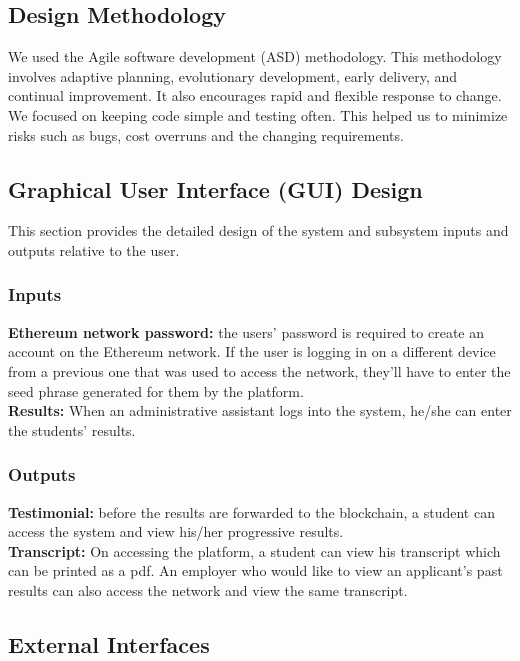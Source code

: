 \subsection{Design Methodology}
We used the Agile software development (ASD) methodology. This methodology involves adaptive planning, evolutionary development, early delivery, and continual improvement. It also encourages rapid and flexible response to change. We focused on keeping code simple and testing often. This helped us to minimize risks such as bugs, cost overruns and the changing requirements.

\subsection{Graphical User Interface (GUI) Design}
This section provides the detailed design of the system and subsystem inputs and outputs relative to the user.

\subsubsection{Inputs}
\textbf{Ethereum network password:} the users’ password is required to create an account on the Ethereum network.  If the user is logging in on a different device from a previous one that was used to access the network, they’ll have to enter the seed phrase generated for them by the platform. \\

\textbf{Results:} When an administrative assistant logs into the system, he/she can enter the students’ results.

\subsubsection{Outputs}
\textbf{Testimonial:} before the results are forwarded to the blockchain, a student can access the system and view his/her progressive results.\\

\textbf{Transcript:} On accessing the platform, a student can view his transcript which can be printed as a pdf. An employer who would like to view an applicant’s past results can also access the network and view the same transcript.\\

\subsection{External Interfaces}

